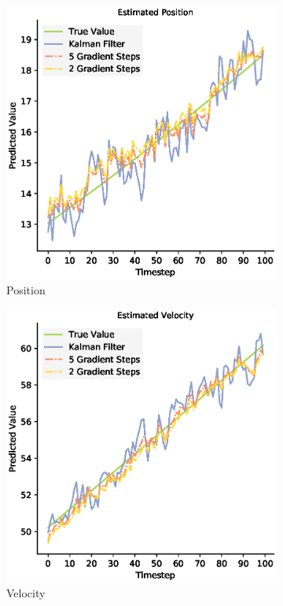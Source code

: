 \begin{figure}[H]
  \begin{subfigure}{0.33\textwidth}
    \centering
    \includegraphics[width=.8\linewidth]{chapter_3_figures/Estimated_Position_NKF_zoomed.eps}
    \caption{Position}
  \end{subfigure}
  \begin{subfigure}{0.33\textwidth}
    \centering
    \includegraphics[width=.8\linewidth]{chapter_3_figures/Estimated_Velocity_NKF_zoomed.eps}
    \caption{Velocity}
  \end{subfigure}
  \begin{subfigure}{0.33\textwidth}
    \centering

\end{subfigure}
\end{figure}
